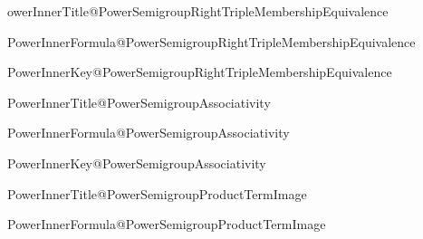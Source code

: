 \expandafter\newcommand\csname PowerInnerTitle@PowerSemigroupRightTripleMembershipEquivalence

\expandafter\newcommand\csname PowerInnerFormula@PowerSemigroupRightTripleMembershipEquivalence

\expandafter\newcommand\csname PowerInnerKey@PowerSemigroupRightTripleMembershipEquivalence

\expandafter\newcommand\csname PowerInnerTitle@PowerSemigroupAssociativity

\expandafter\newcommand\csname PowerInnerFormula@PowerSemigroupAssociativity

\expandafter\newcommand\csname PowerInnerKey@PowerSemigroupAssociativity

\expandafter\newcommand\csname PowerInnerTitle@PowerSemigroupProductTermImage

\expandafter\newcommand\csname PowerInnerFormula@PowerSemigroupProductTermImage

